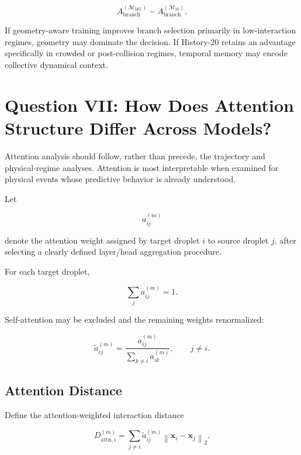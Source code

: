 \documentclass[11pt]{article}
\newcommand{\x}{\mathbf{x}}
\newcommand{\Mmark}{\mathcal{M}_{\mathrm{M}}}
\newcommand{\Mgeom}{\mathcal{M}_{\mathrm{MG}}}
\begin{document}
\begin{equation}
A_{\mathrm{branch}}^{(\Mgeom)}
-
A_{\mathrm{branch}}^{(\Mmark)}.
\end{equation}

If geometry-aware training improves branch selection primarily in low-interaction regimes, geometry may dominate the decision. If History-20 retains an advantage specifically in crowded or post-collision regimes, temporal memory may encode collective dynamical context.

\section{Question VII: How Does Attention Structure Differ Across Models?}

Attention analysis should follow, rather than precede, the trajectory and physical-regime analyses. Attention is most interpretable when examined for physical events whose predictive behavior is already understood.

Let

\begin{equation}
a_{ij}^{(m)}
\end{equation}

denote the attention weight assigned by target droplet \(i\) to source droplet \(j\), after selecting a clearly defined layer/head aggregation procedure.

For each target droplet,

\begin{equation}
\sum_j a_{ij}^{(m)}=1.
\end{equation}

Self-attention may be excluded and the remaining weights renormalized:

\begin{equation}
\tilde{a}_{ij}^{(m)}
=
\frac{
a_{ij}^{(m)}
}{
\sum_{k\neq i}a_{ik}^{(m)}
},
\qquad
j\neq i.
\end{equation}

\subsection{Attention Distance}

Define the attention-weighted interaction distance

\begin{equation}
D_{\mathrm{attn},i}^{(m)}
=
\sum_{j\neq i}
\tilde{a}_{ij}^{(m)}
\left\|
\x_i-\x_j
\right\|_2.
\end{equation}
\end{document}
